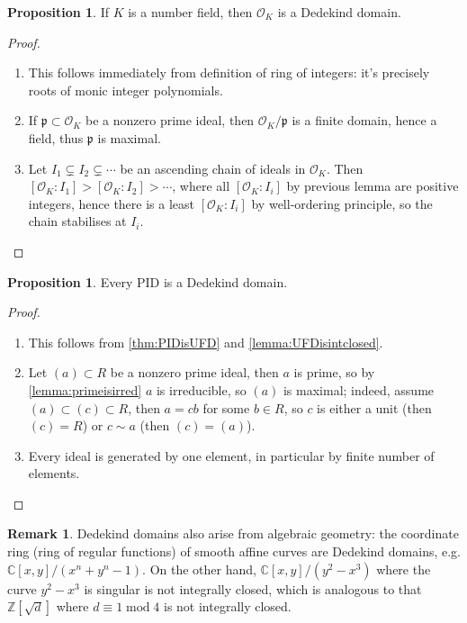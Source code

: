 \documentclass{article}
\newcommand{\Z}{\mathbb{Z}}
\newcommand{\C}{\mathbb{C}}
\newcommand{\Mod}{\operatorname{mod}}
\newcommand{\ri}{\mathcal{O}}
\newcommand{\ip}{\mathfrak{p}}
\theoremstyle{definition}
\newtheorem{prop}[defn]{Proposition}
\newtheorem{remark}[defn]{Remark}
\begin{document}
\begin{prop}
\label{prop:risarededekind}
If $K$ is a number field, then $\ri_K$ is a Dedekind domain.
\end{prop}
\begin{proof}
\begin{enumerate}
\item This follows immediately from definition of ring of integers: it's precisely roots of monic integer polynomials.
\item If $\ip\subset\ri_K$ be a nonzero prime ideal, then $\ri_K/\ip$ is a finite domain, hence a field, thus $\ip$ is maximal.
\item Let $I_1\subsetneq I_2\subsetneq \cdots$ be an ascending chain of ideals in $\ri_K$. Then $\left[\ri_K:I_1\right]> \left[\ri_K:I_2\right]>\cdots$, where all $\left[\ri_K:I_i\right]$ by previous lemma are positive integers, hence there is a least $\left[\ri_K:I_i\right]$ by well-ordering principle, so the chain stabilises at $I_i$.
\end{enumerate}
\end{proof}

\begin{prop}
Every PID is a Dedekind domain.
\end{prop}
\begin{proof}
\begin{enumerate}
\item This follows from \ref{thm:PIDisUFD} and \ref{lemma:UFDisintclosed}.
\item Let $(a)\subset R$ be a nonzero prime ideal, then $a$ is prime, so by \ref{lemma:primeisirred} $a$ is irreducible, so $(a)$ is maximal; indeed, assume $(a)\subset (c)\subset R$, then $a=cb$ for some $b\in R$, so $c$ is either a unit (then $(c)=R$) or $c\sim a$ (then $(c)=(a)$).
\item Every ideal is generated by one element, in particular by finite number of elements.
\end{enumerate}
\end{proof}

\begin{remark}
Dedekind domains also arise from algebraic geometry: the coordinate ring (ring of regular functions) of smooth affine curves are Dedekind domains, e.g. $\C[x,y]/(x^n+y^n-1)$. On the other hand, $\C[x,y]/(y^2-x^3)$ where the curve $y^2-x^3$ is singular is not integrally closed, which is analogous to that $\Z\left[\sqrt d\right]$ where $d\equiv 1\Mod 4$ is not integrally closed.
\end{remark}
\end{document}
